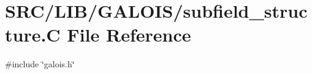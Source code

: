 \hypertarget{subfield__structure_8_c}{}\section{S\+R\+C/\+L\+I\+B/\+G\+A\+L\+O\+I\+S/subfield\+\_\+structure.C File Reference}
\label{subfield__structure_8_c}
{\ttfamily \#include \char`\"{}galois.\+h\char`\"{}}\newline
